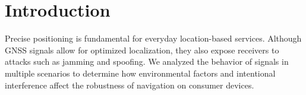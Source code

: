 \section{Introduction}
\label{sec:intro}
Precise positioning is fundamental for everyday location-based services. Although GNSS signals allow for optimized localization, they also expose receivers to attacks such as jamming and spoofing. We analyzed the behavior of signals in multiple scenarios to determine how environmental factors and intentional interference affect the robustness of navigation on consumer devices.